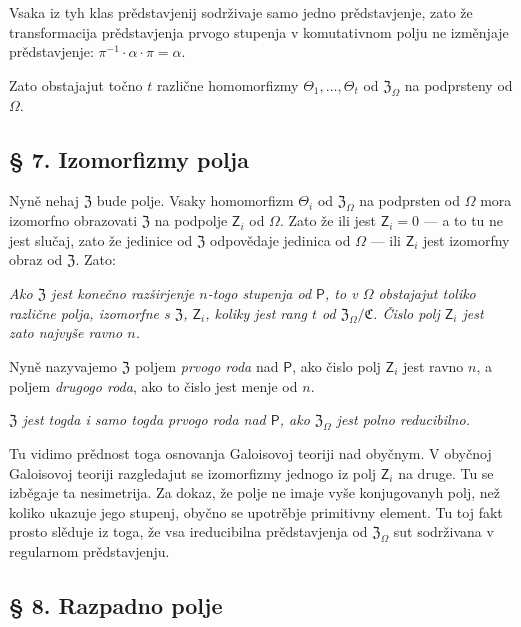 \documentclass[11pt]{article}
\begin{document}
Vsaka iz tyh klas prědstavjenij sodrživaje samo jedno prědstavjenje, zato že transformacija prědstavjenja prvogo stupenja v komutativnom polju ne izměnjaje prědstavjenje: \(\pi^{-1}\cdot\alpha\cdot\pi=\alpha\).

Zato obstajajut točno \(t\) različne homomorfizmy \(\Theta_1,\ldots,\Theta_t\) od \(\mathfrak Z_\Omega\) na podprsteny od \(\Omega\).

\subsection*{§ 7. Izomorfizmy polja}\label{die-isomorphismen-eines-koerpers}

Nyně nehaj \(\mathfrak Z\) bude polje. Vsaky homomorfizm \(\Theta_i\) od \(\mathfrak Z_\Omega\) na podprsten od \(\Omega\) mora izomorfno obrazovati \(\mathfrak Z\) na podpolje \(\mathsf{Z}_i\) od \(\Omega\). Zato že ili jest \(\mathsf{Z}_i=0\) --- a to tu ne jest slučaj, zato že jedinice od \(\mathfrak Z\) odpovědaje jedinica od \(\Omega\) --- ili \(\mathsf{Z}_i\) jest izomorfny obraz od \(\mathfrak Z\). Zato:

\emph{Ako \(\mathfrak Z\) jest konečno razširjenje \(n\)-togo stupenja od \(\mathsf P\), to v \(\Omega\) obstajajut toliko različne polja, izomorfne s \(\mathfrak Z\), \(\mathsf{Z}_i\), koliky jest rang \(t\) od \(\mathfrak Z_\Omega/\mathfrak C\). Čislo polj \(\mathsf{Z}_i\) jest zato najvyše ravno \(n\).}

Nyně nazyvajemo \(\mathfrak Z\) poljem \emph{prvogo roda} nad \(\mathsf P\), ako čislo polj \(\mathsf{Z}_i\) jest ravno \(n\), a poljem \emph{drugogo roda}, ako to čislo jest menje od \(n\).

\emph{\(\mathfrak Z\) jest togda i samo togda prvogo roda nad \(\mathsf P\), ako \(\mathfrak Z_\Omega\) jest polno reducibilno.}

Tu vidimo prědnost toga osnovanja Galoisovoj teoriji nad obyčnym. V obyčnoj Galoisovoj teoriji razgledajut se izomorfizmy jednogo iz polj \(\mathsf{Z}_i\) na druge. Tu se izběgaje ta nesimetrija. Za dokaz, že polje ne imaje vyše konjugovanyh polj, než koliko ukazuje jego stupenj, obyčno se upotrěbje primitivny element. Tu toj fakt prosto slěduje iz toga, že vsa ireducibilna prědstavjenja od \(\mathfrak Z_\Omega\) sut sodrživana v regularnom prědstavjenju.

\subsection*{§ 8. Razpadno polje}\label{der-zerfaellungskoerper}
\end{document}
